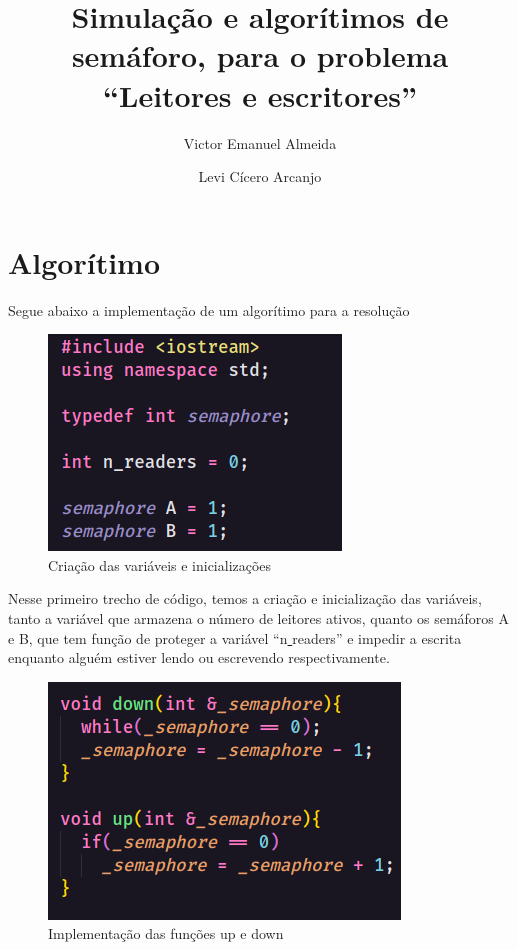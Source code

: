 \documentclass[12pt, a4paper]{article}
\author{Victor Emanuel Almeida \and Levi Cícero Arcanjo}
\title{Simulação e algorítimos de semáforo, para o problema ``Leitores e escritores''}
\begin{document}
\begin{titlepage}
\maketitle\thispagestyle{empty}
\end{titlepage}

\section{Algorítimo}

Segue abaixo a implementação de um algorítimo para a resolução 

\begin{figure}[!htb]
	\centering
	\includegraphics[keepaspectratio]{1.png}
	\caption{\label{fig:1.png} Criação das variáveis e inicializações}
\end{figure}
Nesse primeiro trecho de código, temos a criação e inicialização das variáveis, tanto a variável que armazena o número de leitores ativos, quanto os semáforos A e B, que tem função de proteger a variável ``n\underline{ }readers'' e impedir a escrita enquanto alguém estiver lendo ou escrevendo respectivamente.\\

\begin{figure}[!htb]
	\centering
	\includegraphics[keepaspectratio, scale=.83]{2.png}
	\caption{\label{fig:2.png} Implementação das funções up e down}
\end{figure}
\end{document}
